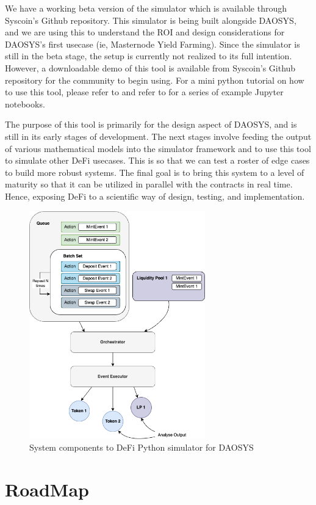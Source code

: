 \documentclass[journal,twocolumn,12pt]{ieeesyscoin}
\begin{document}
We have a working beta version of the simulator which is available through Syscoin’s Github repository. This simulator is being built alongside DAOSYS, and we are using this to understand the ROI and design considerations for DAOSYS’s first usecase (ie, Masternode Yield Farming). Since the simulator is still in the beta stage, the setup is currently not realized to its full intention. However, a downloadable demo of this tool is available from Syscoin's Github repository for the community to begin using. For a mini python tutorial on how to use this tool, please refer to \cite{Moo22B} and refer to \cite{DAOSim22} for a series of example Jupyter notebooks.

The purpose of this tool is primarily for the design aspect of DAOSYS, and is still in its early stages of development. The next stages involve feeding the output of various mathematical models into the simulator framework and to use this tool to simulate other DeFi usecases. This is so that we can test a roster of edge cases to build more robust systems. The final goal is to bring this system to a level of maturity so that it can be utilized in parallel with the contracts in real time. Hence, exposing DeFi to a scientific way of design, testing, and implementation.

\begin{figure}[h!]
\includegraphics[width=3in]{img/simulator.png}
\caption{System components to DeFi Python simulator for DAOSYS} 
\label{fig:simulator}
\end{figure} 

\section{RoadMap}
\label{sec:roadmap}
\end{document}
